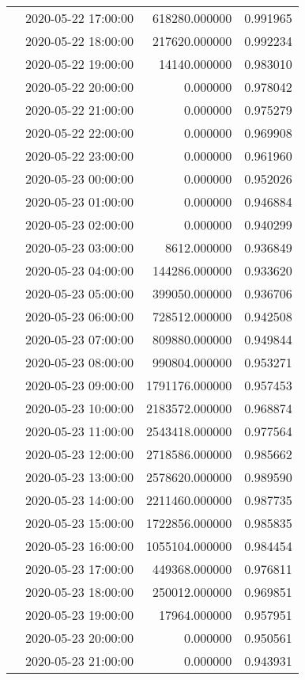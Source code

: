 \begin{tabular}{llrr}
 & 2020-05-22 17:00:00 & 618280.000000 & 0.991965 \\
 & 2020-05-22 18:00:00 & 217620.000000 & 0.992234 \\
 & 2020-05-22 19:00:00 & 14140.000000 & 0.983010 \\
 & 2020-05-22 20:00:00 & 0.000000 & 0.978042 \\
 & 2020-05-22 21:00:00 & 0.000000 & 0.975279 \\
 & 2020-05-22 22:00:00 & 0.000000 & 0.969908 \\
 & 2020-05-22 23:00:00 & 0.000000 & 0.961960 \\
 & 2020-05-23 00:00:00 & 0.000000 & 0.952026 \\
 & 2020-05-23 01:00:00 & 0.000000 & 0.946884 \\
 & 2020-05-23 02:00:00 & 0.000000 & 0.940299 \\
 & 2020-05-23 03:00:00 & 8612.000000 & 0.936849 \\
 & 2020-05-23 04:00:00 & 144286.000000 & 0.933620 \\
 & 2020-05-23 05:00:00 & 399050.000000 & 0.936706 \\
 & 2020-05-23 06:00:00 & 728512.000000 & 0.942508 \\
 & 2020-05-23 07:00:00 & 809880.000000 & 0.949844 \\
 & 2020-05-23 08:00:00 & 990804.000000 & 0.953271 \\
 & 2020-05-23 09:00:00 & 1791176.000000 & 0.957453 \\
 & 2020-05-23 10:00:00 & 2183572.000000 & 0.968874 \\
 & 2020-05-23 11:00:00 & 2543418.000000 & 0.977564 \\
 & 2020-05-23 12:00:00 & 2718586.000000 & 0.985662 \\
 & 2020-05-23 13:00:00 & 2578620.000000 & 0.989590 \\
 & 2020-05-23 14:00:00 & 2211460.000000 & 0.987735 \\
 & 2020-05-23 15:00:00 & 1722856.000000 & 0.985835 \\
 & 2020-05-23 16:00:00 & 1055104.000000 & 0.984454 \\
 & 2020-05-23 17:00:00 & 449368.000000 & 0.976811 \\
 & 2020-05-23 18:00:00 & 250012.000000 & 0.969851 \\
 & 2020-05-23 19:00:00 & 17964.000000 & 0.957951 \\
 & 2020-05-23 20:00:00 & 0.000000 & 0.950561 \\
 & 2020-05-23 21:00:00 & 0.000000 & 0.943931 \\

\end{tabular}
